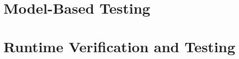 \documentclass[a4paper, 12pt]{article}
\begin{document}
\section{Model-Based Testing}

\section{Runtime Verification and Testing}


 
\end{document}
